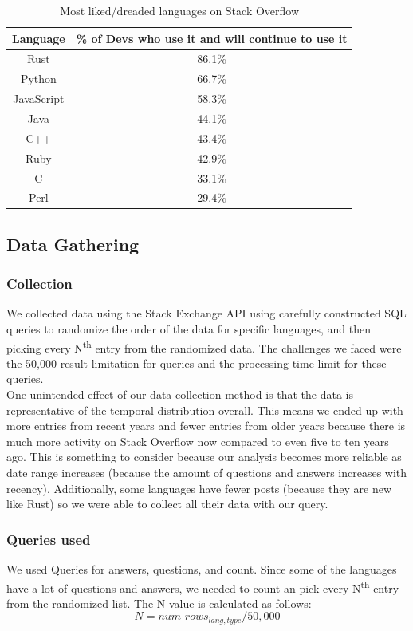\documentclass[conference]{IEEEtran}
\begin{document}
\begin{table}[htbp]
\caption{Most liked/dreaded languages on Stack Overflow}
\begin{center}
\begin{tabular}{|c|c|}
\hline
\textbf{Language}&\textbf{\% of Devs who use it and will continue to use it}\\
\hline
Rust&86.1\%\\
\hline
Python&66.7\%\\
\hline
JavaScript&58.3\%\\
\hline
Java&44.1\%\\
\hline
C++&43.4\%\\
\hline
Ruby&42.9\%\\
\hline
C&33.1\%\\
\hline
Perl&29.4\%\\
\hline
\end{tabular}
\label{tab1}
\end{center}
\end{table}

\subsection{Data Gathering}
\subsubsection{Collection}
We collected data using the Stack Exchange API \cite{b28} using carefully constructed SQL queries to randomize the order of the data for specific languages, and then picking every N\textsuperscript{th} entry from the randomized data. The challenges we faced were the 50,000 result limitation for queries and the processing time limit for these queries.\\

One unintended effect of our data collection method is that the data is representative of the temporal distribution overall. This means we ended up with more entries from recent years and fewer entries from older years because there is much more activity on Stack Overflow now compared to even five to ten years ago. This is something to consider because our analysis becomes more reliable as date range increases (because the amount of questions and answers increases with recency). Additionally, some languages have fewer posts (because they are new like Rust) so we were able to collect all their data with our query.\\

\subsubsection{Queries used}
We used Queries for answers, questions, and count. Since some of the languages have a lot of questions and answers, we needed to count an pick every N\textsuperscript{th} entry from the randomized list. The N-value is calculated as follows:
\begin{equation}
    N = num\_rows_{lang, type} / 50,000
\end{equation}
\end{document}
